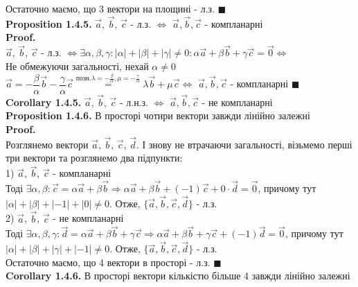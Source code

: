 \documentclass[a4paper, 14pt]{extarticle}
\def\prp#1{\textbf{Proposition {#1}}}
\def\crl#1{\textbf{Corollary {#1}}}
\def\proof{\textbf{Proof.}\\}
\def\bigline{\vspace{5mm}\\}
\def\qed{$\blacksquare$}
\begin{document}
	Остаточно маємо, що 3 вектори на площині - л.з. \qed
	\bigline
	\prp{1.4.5.} $\vec{a}$, $\vec{b}$, $\vec{c}$ - л.з. $\iff$ $\vec{a},\vec{b},\vec{c}$ - компланарні\\
	\proof
	$\vec{a}$, $\vec{b}$, $\vec{c}$ - л.з. $\iff \exists \alpha, \beta, \gamma: |\alpha| + |\beta| + |\gamma| \neq 0: \alpha \vec{a} + \beta \vec{b} + \gamma \vec{c} = \vec{0} \iff$\\
	Не обмежуючи загальності, нехай $\alpha \neq 0$\\
	$\vec{a} = -\dfrac{\beta}{\alpha} \vec{b} - \dfrac{\gamma}{\alpha} \vec{c} \overset{\textrm{позн.} \lambda = -\frac{\beta}{\alpha}, \mu = -\frac{\gamma}{\alpha}}{=} \lambda \vec{b} + \mu \vec{c} \iff$ $\vec{a},\vec{b},\vec{c}$ - компланарні \qed
	\bigline
	\crl{1.4.5.} $\vec{a}$, $\vec{b}$, $\vec{c}$ - л.н.з. $\iff$ $\vec{a},\vec{b},\vec{c}$ - не компланарні
	\bigline
	\prp{1.4.6.} В просторі чотири вектори завжди лінійно залежні\\
	\proof
	Розглянемо вектори $\vec{a}$, $\vec{b}$, $\vec{c}$, $\vec{d}$. І знову не втрачаючи загальності, візьмемо перші три вектори та розглянемо два підпункти:\\
	1) $\vec{a}$, $\vec{b}$, $\vec{c}$ - компланарні\\
	Тоді $\exists \alpha, \beta: \vec{c} = \alpha \vec{a} + \beta \vec{b} \Rightarrow \alpha \vec{a} + \beta \vec{b} + (-1)\vec{c} + 0 \cdot \vec{d} = \vec{0}$, причому тут $|\alpha| + |\beta| + |-1| + |0| \neq 0$. Отже, $\{\vec{a}, \vec{b}, \vec{c}, \vec{d}\}$ - л.з.\\
	2) $\vec{a}$, $\vec{b}$, $\vec{c}$ - не компланарні\\
	Тоді $\exists \alpha, \beta, \gamma: \vec{d} = \alpha \vec{a} + \beta \vec{b} + \gamma \vec{c} \Rightarrow \alpha \vec{a} + \beta \vec{b} + \gamma \vec{c} + (-1)\vec{d} = \vec{0}$, причому тут $|\alpha| + |\beta| + |\gamma| + |-1| \neq 0$. Отже, $\{\vec{a}, \vec{b}, \vec{c}, \vec{d}\}$ - л.з.\\
	Остаточно маємо, що 4 вектори в просторі - л.з. \qed
	\bigline
	\crl{1.4.6.} В просторі вектори кількістю більше 4 завжди лінійно залежні
	
\end{document}
